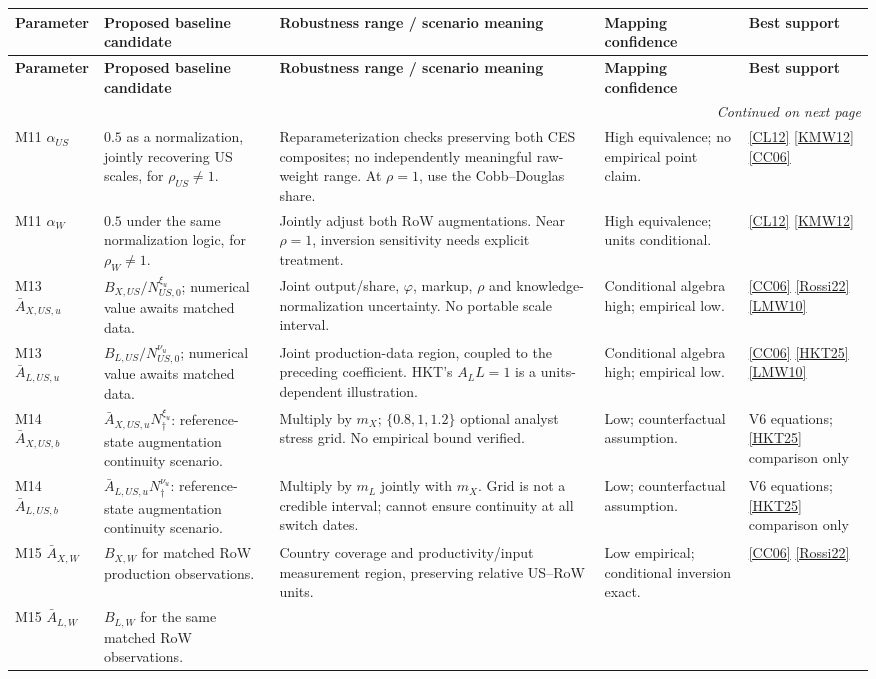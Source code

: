 \documentclass[10pt,a4paper,landscape]{article}
\makeatletter
\newcommand{\src}[1]{\hyperlink{ref:#1}{\textsf{[#1]}}}
\newenvironment{recommendations}{%
\fontsize{9.4}{10.9}\selectfont\setlength{\parskip}{2pt}
\begin{longtable}{@{}P{\dimexpr .14\textwidth-8pt\relax}P{\dimexpr .25\textwidth-8pt\relax}P{\dimexpr .32\textwidth-8pt\relax}P{\dimexpr .15\textwidth-8pt\relax}P{\dimexpr .14\textwidth-8pt\relax}@{}}
\toprule\rowcolor{tablehead}\textbf{Parameter} & \textbf{Proposed baseline candidate} & \textbf{Robustness range / scenario meaning} & \textbf{Mapping confidence} & \textbf{Best support}\\\midrule
\endfirsthead
\toprule\rowcolor{tablehead}\textbf{Parameter} & \textbf{Proposed baseline candidate} & \textbf{Robustness range / scenario meaning} & \textbf{Mapping confidence} & \textbf{Best support}\\\midrule
\endhead
\midrule\multicolumn{5}{r}{\footnotesize\itshape Continued on next page}\\\endfoot
\bottomrule\endlastfoot
}{\end{longtable}}
\makeatother
\begin{document}
\begin{recommendations}
M11 $\alpha_{US}$
& $0.5$ as a normalization, jointly recovering US scales, for $\rho_{US}\ne1$.
& Reparameterization checks preserving both CES composites;
no independently meaningful raw-weight range.
At $\rho=1$, use the Cobb--Douglas share.
& High equivalence; no empirical point claim.
& \src{CL12} \src{KMW12} \src{CC06}\\[5pt]
M11 $\alpha_W$
& $0.5$ under the same normalization logic, for $\rho_W\ne1$.
& Jointly adjust both RoW augmentations.
Near $\rho=1$, inversion sensitivity needs explicit treatment.
& High equivalence; units conditional.
& \src{CL12} \src{KMW12}\\[5pt]
M13 $\bar A_{X,US,u}$
& $B_{X,US}/N_{US,0}^{\xi_u}$; numerical value awaits matched data.
& Joint output/share, $\varphi$, markup, $\rho$ and knowledge-normalization uncertainty.
No portable scale interval.
& Conditional algebra high; empirical low.
& \src{CC06} \src{Rossi22} \src{LMW10}\\[5pt]
M13 $\bar A_{L,US,u}$
& $B_{L,US}/N_{US,0}^{\nu_u}$; numerical value awaits matched data.
& Joint production-data region, coupled to the preceding coefficient.
HKT's $A_LL=1$ is a units-dependent illustration.
& Conditional algebra high; empirical low.
& \src{CC06} \src{HKT25} \src{LMW10}\\[5pt]
M14 $\bar A_{X,US,b}$
& $\bar A_{X,US,u}N_\dagger^{\xi_u}$: reference-state augmentation continuity scenario.
& Multiply by $m_X$; $\{0.8,1,1.2\}$ optional analyst stress grid.
No empirical bound verified.
& Low; counterfactual assumption.
& V6 equations; \src{HKT25} comparison only\\[5pt]
M14 $\bar A_{L,US,b}$
& $\bar A_{L,US,u}N_\dagger^{\nu_u}$: reference-state augmentation continuity scenario.
& Multiply by $m_L$ jointly with $m_X$.
Grid is not a credible interval; cannot ensure continuity at all switch dates.
& Low; counterfactual assumption.
& V6 equations; \src{HKT25} comparison only\\[5pt]
M15 $\bar A_{X,W}$
& $B_{X,W}$ for matched RoW production observations.
& Country coverage and productivity/input measurement region,
preserving relative US--RoW units.
& Low empirical; conditional inversion exact.
& \src{CC06} \src{Rossi22}\\[5pt]
M15 $\bar A_{L,W}$
& $B_{L,W}$ for the same matched RoW observations.

\end{recommendations}
\end{document}
